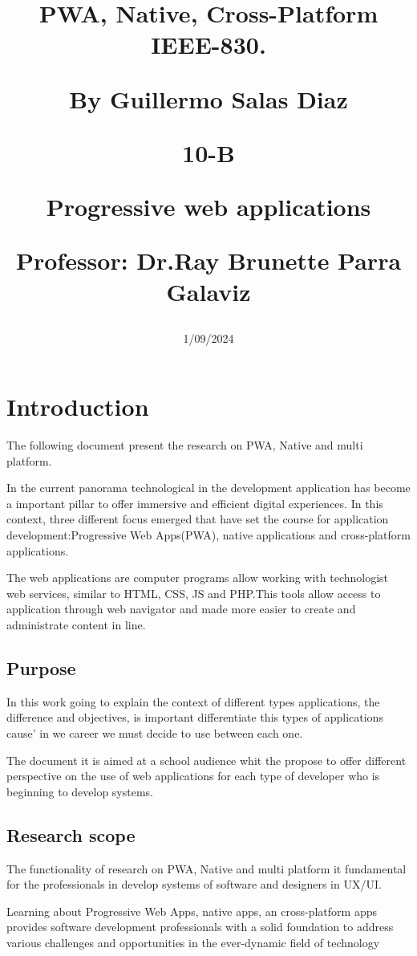 \documentclass[12pt,a4paper, twosite]{article}
\title{
	PWA, Native, Cross-Platform   IEEE-830.
	\item {By Guillermo Salas Diaz}
	\item {10-B}
	\item {Progressive web applications}
	\item {Professor: Dr.Ray Brunette Parra Galaviz }

	  }
\date{1/09/2024}
\begin{document}
	
	\maketitle
	\tableofcontents
	
	\newpage
	
	\section{Introduction}
	\label{sec:introduction}
	The following document present the research on PWA, Native and multi platform.
	
	In the current panorama technological in the development application has become a important pillar to offer immersive and efficient digital experiences. In this context, three different focus emerged that have set the course for application development:Progressive Web Apps(PWA), native applications and cross-platform applications.
	
	
	
	
	The web applications are computer programs allow
	working with technologist web services, similar to HTML, CSS, JS and PHP.This tools allow access to application through web navigator and made more easier to create and administrate content in line.
	\subsection{Purpose}
	\label{sec:purpose}
	
	In this work going to explain the context of  different types applications, the difference and  objectives, is important differentiate this types of applications cause' in we career we must decide to use between each one.
	
	The document it is aimed at a school audience whit the propose to offer different perspective on the use of web applications for each type of developer who is beginning to develop systems.
	\subsection{Research scope}
	\label{sec:scope}
	
	The functionality of  research on PWA, Native and multi platform it fundamental for the professionals in develop systems of software and designers in UX/UI.
	
	Learning about Progressive Web Apps, native apps, an cross-platform apps provides software development professionals with a solid foundation to address various challenges and opportunities in the ever-dynamic field of technology
	
\end{document}
